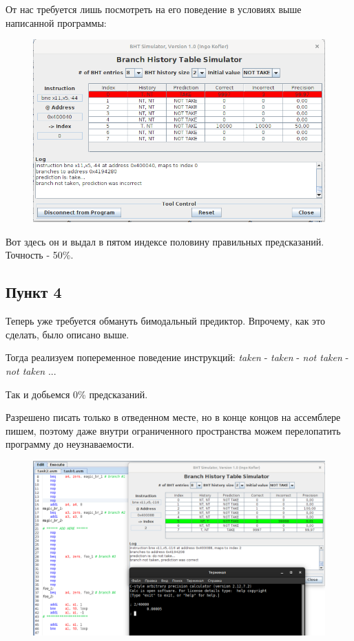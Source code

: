 От нас требуется лишь посмотреть на его поведение в условиях выше написанной программы:

\begin{figure}[H]
    \centering
    \includegraphics[width=0.75\linewidth]{Part3/BHTbim.png}
\end{figure}

Вот здесь он и выдал в пятом индексе половину правильных предсказаний. \\
Точность - 50\%.

\subsection*{Пункт 4}

Теперь уже требуется обмануть бимодальный предиктор. Впрочему, как это сделать, было описано выше.

Тогда реализуем попеременное поведение инструкций: \textit{taken} - \textit{taken} - \textit{not taken} - \textit{not taken} ...

Так и добьемся 0\% предсказаний.

Разрешено писать только в отведенном месте, но в конце концов на ассемблере пишем, поэтому даже внутри ограниченного пространства можем перелопатить программу до неузнаваемости. 

\begin{figure}[H]
    \centering
    \includegraphics[width=1\linewidth]{Part4/task4.png}
\end{figure}

